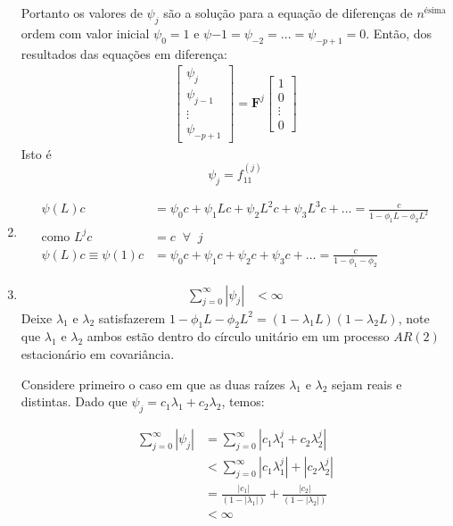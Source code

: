 \begin{enumerate}
		Portanto os valores de $\psi_j$ são a solução para a equação de diferenças de $n^{\text{ésima}}$ ordem com valor inicial $\psi_0=1$ e $\psi{-1}=\psi_{-2}=...=\psi_{-p+1}=0$. Então, dos resultados das equações em diferença:
		\begin{align*}
		\begin{bmatrix}
			\psi_j\\
			\psi_{j-1}\\
			\vdots\\
			\psi_{-p+1}
		\end{bmatrix}
		=
		\mathbf{F}^j\begin{bmatrix}
			1\\
			0\\
			\vdots\\
			0
		\end{bmatrix}
		\end{align*}
		Isto é $$\psi_j=f_{11}^{(j)}$$
		
		\item[\fbox{3.4}]
		
		\begin{align*}
			\psi(L)c&=\psi_0c+\psi_1Lc+\psi_2L^2c+\psi_3L^3c+...
			=\frac{c}{1-\phi_1L-\phi_2L^2}\\
			\text{como } L^jc&=c \;\; \forall \;\;j\\
			\psi(L)c\equiv\psi(1)c&=\psi_0c+\psi_1c+\psi_2c+\psi_3c+...
			=\frac{c}{1-\phi_1-\phi_2}			
		\end{align*}
		
		\item[\fbox{3.5}]
		\begin{align*}
		\sum \limits_{j=0}^{\infty}|\psi_j|&<\infty			
		\end{align*}
		Deixe $\lambda_1$ e $\lambda_2$ satisfazerem $1-\phi_1L-\phi_2L^2=(1-\lambda_1L)(1-\lambda_2L)$, note que $\lambda_1$ e $\lambda_2$ ambos estão dentro do círculo unitário em um processo $AR(2)$ estacionário em covariância.
		
		Considere primeiro o caso em que as duas raízes $\lambda_1$ e $\lambda_2$ sejam reais e  distintas. Dado que $\psi_j=c_1\lambda_1+c_2\lambda_2$, temos:
		
			\begin{align*}
				\sum \limits_{j=0}^{\infty}|\psi_j|&=\sum \limits_{j=0}^{\infty}|c_1\lambda_1^j+c_2\lambda^j_2|\\
				&<\sum \limits_{j=0}^{\infty}|c_1\lambda_1^j|+|c_2\lambda_2^j|\\
				&=\frac{|c_1|}{(1-|\lambda_1|)}+\frac{|c_2|}{(1-|\lambda_2|)}\\
				&<\infty
			\end{align*}
			

\end{enumerate}

